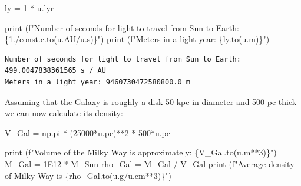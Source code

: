 \documentclass[
  letterpaper,
  DIV=11,
  numbers=noendperiod]{scrreprt}
\newenvironment{Shaded}{\begin{snugshade}}{\end{snugshade}}
\newcommand{\BuiltInTok}[1]{\textcolor[rgb]{0.00,0.23,0.31}{#1}}
\newcommand{\DecValTok}[1]{\textcolor[rgb]{0.68,0.00,0.00}{#1}}
\newcommand{\FloatTok}[1]{\textcolor[rgb]{0.68,0.00,0.00}{#1}}
\newcommand{\NormalTok}[1]{\textcolor[rgb]{0.00,0.23,0.31}{#1}}
\newcommand{\OperatorTok}[1]{\textcolor[rgb]{0.37,0.37,0.37}{#1}}
\newcommand{\SpecialCharTok}[1]{\textcolor[rgb]{0.37,0.37,0.37}{#1}}
\newcommand{\SpecialStringTok}[1]{\textcolor[rgb]{0.13,0.47,0.30}{#1}}
\begin{document}
\begin{Shaded}
\begin{Highlighting}[]
\NormalTok{ly }\OperatorTok{=} \DecValTok{1} \OperatorTok{*}\NormalTok{ u.lyr}

\BuiltInTok{print}\NormalTok{ (}\SpecialStringTok{f"Number of seconds for light to travel from Sun to Earth: }\SpecialCharTok{\{}\FloatTok{1.}\OperatorTok{/}\NormalTok{const}\SpecialCharTok{.}\NormalTok{c}\SpecialCharTok{.}\NormalTok{to(u.AU}\OperatorTok{/}\NormalTok{u.s)}\SpecialCharTok{\}}\SpecialStringTok{"}\NormalTok{)}
\BuiltInTok{print}\NormalTok{ (}\SpecialStringTok{f"Meters in a light year: }\SpecialCharTok{\{}\NormalTok{ly}\SpecialCharTok{.}\NormalTok{to(u.m)}\SpecialCharTok{\}}\SpecialStringTok{"}\NormalTok{)}
\end{Highlighting}
\end{Shaded}

\begin{verbatim}
Number of seconds for light to travel from Sun to Earth: 499.0047838361565 s / AU
Meters in a light year: 9460730472580800.0 m
\end{verbatim}

Assuming that the Galaxy is roughly a disk 50 kpc in diameter and 500 pc
thick we can now calculate its density:

\begin{Shaded}
\begin{Highlighting}[]
\NormalTok{V\_Gal }\OperatorTok{=}\NormalTok{  np.pi }\OperatorTok{*}\NormalTok{ (}\DecValTok{25000}\OperatorTok{*}\NormalTok{u.pc)}\OperatorTok{**}\DecValTok{2} \OperatorTok{*} \DecValTok{500}\OperatorTok{*}\NormalTok{u.pc}

\BuiltInTok{print}\NormalTok{ (}\SpecialStringTok{f"Volume of the Milky Way is approximately: }\SpecialCharTok{\{}\NormalTok{V\_Gal}\SpecialCharTok{.}\NormalTok{to(u.m}\OperatorTok{**}\DecValTok{3}\NormalTok{)}\SpecialCharTok{\}}\SpecialStringTok{"}\NormalTok{)}
\NormalTok{M\_Gal }\OperatorTok{=} \FloatTok{1E12} \OperatorTok{*}\NormalTok{ M\_Sun}
\NormalTok{rho\_Gal }\OperatorTok{=}\NormalTok{ M\_Gal }\OperatorTok{/}\NormalTok{ V\_Gal}
\BuiltInTok{print}\NormalTok{ (}\SpecialStringTok{f"Average density of Milky Way is }\SpecialCharTok{\{}\NormalTok{rho\_Gal}\SpecialCharTok{.}\NormalTok{to(u.g}\OperatorTok{/}\NormalTok{u.cm}\OperatorTok{**}\DecValTok{3}\NormalTok{)}\SpecialCharTok{\}}\SpecialStringTok{"}\NormalTok{)}
\end{Highlighting}
\end{Shaded}
\end{document}
